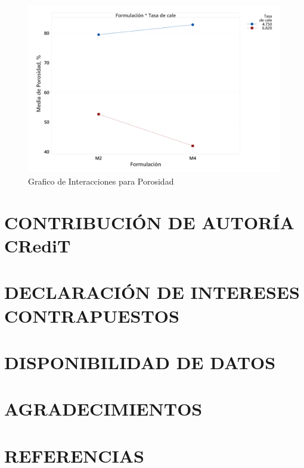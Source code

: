 \documentclass{article}
\begin{document}
\begin{figure}[ht]
    \centering
    \includegraphics[width=0.7\linewidth]{Graphics/Grafico de interacciones de Porosidad.png}
    \caption{Grafico de Interacciones para Porosidad}
    \label{fig:InteractPorosidad}
\end{figure}



\newpage
\section{CONTRIBUCIÓN DE AUTORÍA CRediT}

\section{DECLARACIÓN DE INTERESES CONTRAPUESTOS}

\section{DISPONIBILIDAD DE DATOS}

\section{AGRADECIMIENTOS}

\section{REFERENCIAS}

\printbibliography
\end{document}
